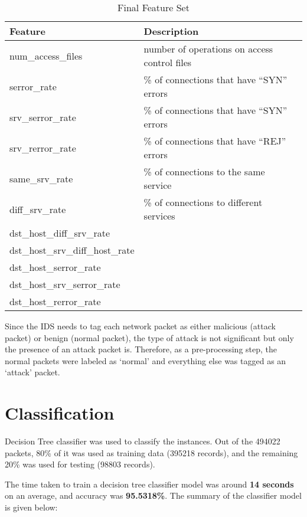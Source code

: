 \documentclass[11pt]{article}
\begin{document}
\begin{table}
\caption{Final Feature Set}
\centering
\begin{tabular}{l*{2}{l}}
Feature & Description \\
\hline
num\_access\_files & number of operations on access control files  \\
serror\_rate & \% of connections that have ``SYN'' errors  \\
srv\_serror\_rate & \% of connections that have ``SYN'' errors  \\
srv\_rerror\_rate & \% of connections that have ``REJ'' errors  \\
same\_srv\_rate & \% of connections to the same service \\
diff\_srv\_rate & \% of connections to different services \\
dst\_host\_diff\_srv\_rate &  \\
dst\_host\_srv\_diff\_host\_rate &  \\
dst\_host\_serror\_rate &  \\
dst\_host\_srv\_serror\_rate &  \\
dst\_host\_rerror\_rate &  \\
\end{tabular}
\label{Tab:features}
\end{table}

Since the IDS needs to tag each network packet as either malicious (attack packet) or benign (normal packet), the type of attack is not significant but only the presence of an attack packet is. Therefore, as a pre-processing step, the normal packets were labeled as `normal' and everything else was tagged as an `attack' packet.

\section{Classification}
Decision Tree classifier was used to classify the instances. Out of the 494022 packets, 80\% of it was used as training data (395218 records), and the remaining 20\% was used for testing (98803 records).

The time taken to train a decision tree classifier model was around {\bf 14 seconds} on an average, and accuracy was {\bf 95.5318\%}. The summary of the classifier model is given below:
\end{document}
